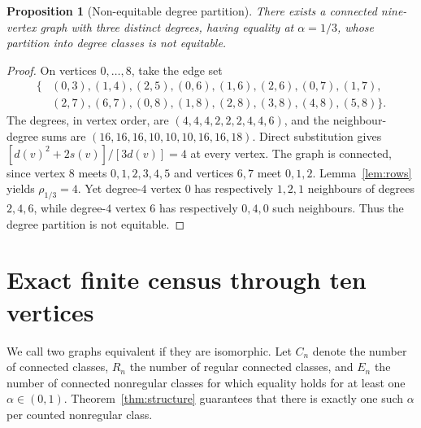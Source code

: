 \documentclass[11pt]{amsart}
\newtheorem{proposition}[theorem]{Proposition}
\theoremstyle{remark}
\begin{document}
\begin{proposition}[Non-equitable degree partition]\label{prop:noneq}
There exists a connected nine-vertex graph with three distinct
degrees, having equality at $\alpha=1/3$, whose partition into
degree classes is not equitable.
\end{proposition}
\begin{proof}
On vertices $0,\ldots,8$, take the edge set
\[
\begin{split}
\{&(0,3),(1,4),(2,5),(0,6),(1,6),(2,6),
(0,7),(1,7),\\
 &(2,7),(6,7),(0,8),(1,8),(2,8),(3,8),
 (4,8),(5,8)\}.
\end{split}
\]
The degrees, in vertex order, are
$(4,4,4,2,2,2,4,4,6)$, and the neighbour-degree sums are
$(16,16,16,10,10,10,16,16,18)$.
Direct substitution gives
$[d(v)^2+2s(v)]/[3d(v)]=4$ at every vertex.
The graph is connected, since vertex $8$ meets
$0,1,2,3,4,5$ and vertices $6,7$ meet $0,1,2$.
Lemma~\ref{lem:rows} yields $\rho_{1/3}=4$.
Yet degree-$4$ vertex $0$ has respectively $1,2,1$
neighbours of degrees $2,4,6$, while degree-$4$
vertex $6$ has respectively $0,4,0$ such neighbours.
Thus the degree partition is not equitable.
\end{proof}

\section{Exact finite census through ten vertices}\label{sec:census}
We call two graphs equivalent if they are isomorphic. Let $C_n$
denote the number of connected classes, $R_n$ the number of regular
connected classes, and $E_n$ the number of connected nonregular
classes for which equality holds for at least one $\alpha\in(0,1)$.
Theorem~\ref{thm:structure} guarantees that there is exactly
one such $\alpha$ per counted nonregular class.
\end{document}

